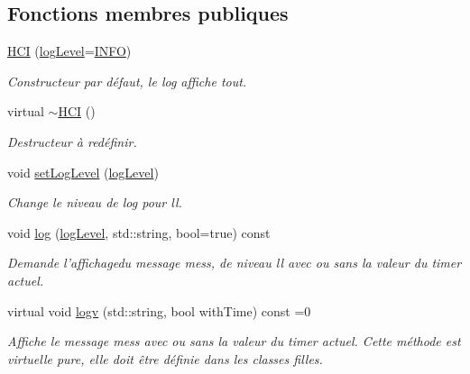 \subsection*{Fonctions membres publiques}
\begin{DoxyCompactItemize}
\item 
\hypertarget{classHCI_a3cac51013396bb8a130298a04b966856}{\hyperlink{classHCI_a3cac51013396bb8a130298a04b966856}{H\-C\-I} (\hyperlink{classHCI_a395f0ab7958108f23c34c7a04b56c4b0}{log\-Level}=\hyperlink{classHCI_a395f0ab7958108f23c34c7a04b56c4b0ab3f339d63b08c4a353f0f6609366d6a2}{I\-N\-F\-O})}\label{classHCI_a3cac51013396bb8a130298a04b966856}

\begin{DoxyCompactList}\small\item\em Constructeur par défaut, le log affiche tout. \end{DoxyCompactList}\item 
\hypertarget{classHCI_a755b329144a4144f838962bebc752452}{virtual \hyperlink{classHCI_a755b329144a4144f838962bebc752452}{$\sim$\-H\-C\-I} ()}\label{classHCI_a755b329144a4144f838962bebc752452}

\begin{DoxyCompactList}\small\item\em Destructeur à redéfinir. \end{DoxyCompactList}\item 
\hypertarget{classHCI_ab30b1bd8e7b5ddb8764128e9da1b3062}{void \hyperlink{classHCI_ab30b1bd8e7b5ddb8764128e9da1b3062}{set\-Log\-Level} (\hyperlink{classHCI_a395f0ab7958108f23c34c7a04b56c4b0}{log\-Level})}\label{classHCI_ab30b1bd8e7b5ddb8764128e9da1b3062}

\begin{DoxyCompactList}\small\item\em Change le niveau de log pour ll. \end{DoxyCompactList}\item 
\hypertarget{classHCI_a23d45789a6c59b9a14a1fdd95c970c30}{void \hyperlink{classHCI_a23d45789a6c59b9a14a1fdd95c970c30}{log} (\hyperlink{classHCI_a395f0ab7958108f23c34c7a04b56c4b0}{log\-Level}, std\-::string, bool=true) const }\label{classHCI_a23d45789a6c59b9a14a1fdd95c970c30}

\begin{DoxyCompactList}\small\item\em Demande l'affichagedu message mess, de niveau ll avec ou sans la valeur du timer actuel. \end{DoxyCompactList}\item 
\hypertarget{classHCI_a94b64e0a6405c8fadaf89bada74b7b38}{virtual void \hyperlink{classHCI_a94b64e0a6405c8fadaf89bada74b7b38}{logv} (std\-::string, bool with\-Time) const =0}\label{classHCI_a94b64e0a6405c8fadaf89bada74b7b38}

\begin{DoxyCompactList}\small\item\em Affiche le message mess avec ou sans la valeur du timer actuel. Cette méthode est virtuelle pure, elle doit être définie dans les classes filles. \end{DoxyCompactList}\end{DoxyCompactItemize}
